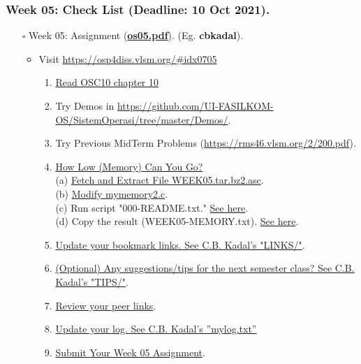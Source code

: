 \begin{frame}
\frametitle{Week 05: Check List (Deadline: 10 Oct 2021).}
\begin{itemize}
\item [$\square$] Week 05: Assignment (\href{https://os.vlsm.org/Slides/os05.pdf}{\textbf{os05.pdf}}).
(Eg. \textbf{cbkadal}).
\begin{itemize}
\item Visit \url{https://osp4diss.vlsm.org/\#idx0705}

\begin{enumerate}
\item \href{https://www.os-book.com/OS10/slide-dir/}{Read OSC10 chapter 10}
\item Try Demos in {\tiny \url{https://github.com/UI-FASILKOM-OS/SistemOperasi/tree/master/Demos/}}.
\item Try Previous MidTerm Problems {\tiny (\url{https://rms46.vlsm.org/2/200.pdf})}.
\item \href{https://osp4diss.vlsm.org/W05-01.html}{How Low (Memory) Can You Go?}\\
(a) \href{https://os.vlsm.org/WEEK/WEEK05.tar.bz2.asc}{Fetch and Extract File WEEK05.tar.bz2.asc}.\\
(b) \href{https://osp4diss.vlsm.org/W05-02.html}{Modify mymemory2.c}.\\
(c) Run script "000-README.txt." \href{https://osp4diss.vlsm.org/W04-01.html}{See here}.\\
(d) Copy the result (WEEK05-MEMORY.txt). \href{https://osp4diss.vlsm.org/W04-03.html}{See here}.\\
\item \href{https://cbkadal.github.io/os212/LINKS/}{Update your bookmark links. See C.B. Kadal's "LINKS/"}.
\item \href{https://cbkadal.github.io/os212/TIPS/}{(Optional) Any suggestions/tips for the next semester class? See C.B. Kadal's "TIPS/"}.
\item \href{https://osp4diss.vlsm.org/W02-05.html}{Review your peer links}.
\item \href{https://cbkadal.github.io/os212/TXT/mylog.txt}{Update your log. See C.B. Kadal's ''mylog.txt''}
\item \href{https://osp4diss.vlsm.org/W03-06.html}{Submit Your Week 05 Assignment}.
\end{enumerate}
\end{itemize}
\end{itemize}
\end{frame}

